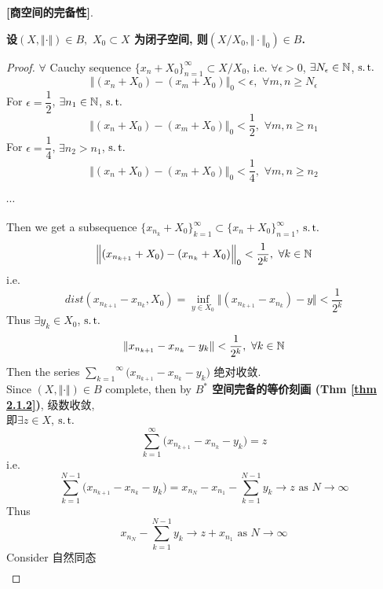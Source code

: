 	\vspace{1em}
	
	\begin{thm}\label{thm 2.4.1}
		\textbf{[商空间的完备性]}. 
		\begin{center}
			\textbf{设$(X , \Vert \cdot \Vert) \in B , \,\, X_0 \subset X$ 为闭子空间, 则$(X / X_0 , \Vert \cdot \Vert_0) \in B$.}
		\end{center}
		
		\vspace{4em}
		
		\begin{proof}
			$\forall$ Cauchy sequence $\{ x_n + X_0 \}_{n = 1}^{\infty} \subset X / X_0$, i.e. $\forall \epsilon > 0$, $\exists N_\epsilon \in \mathbb{N}$, $\operatorname{s.t.}$
			\[ \Big\Vert (x_n + X_0) - (x_m + X_0) \Big\Vert_0 < \epsilon , \,\, \forall m , n \geq N_\epsilon \]
			For $\epsilon = \dfrac{1}{2}$, $\exists n_1 \in \mathbb{N}$, $\operatorname{s.t.}$
			\[ \Big\Vert (x_n + X_0) - (x_m + X_0) \Big\Vert_0 < \frac{1}{2} , \,\, \forall m , n \geq n_1 \]
			For $\epsilon = \dfrac{1}{4}$, $\exists n_2 > n_1$, $\operatorname{s.t.}$
			\[ \Big\Vert (x_n + X_0) - (x_m + X_0) \Big\Vert_0 < \frac{1}{4} , \,\, \forall m , n \geq n_2 \]
			\begin{center}
				$\cdots$
			\end{center}
			Then we get a subsequence $\{ x_{n_k} + X_0 \}_{k = 1}^{\infty} \subset \{ x_n + X_0 \}_{n = 1}^{\infty}$, $\operatorname{s.t.}$
			\[ \Big\Vert (x_{n_{k + 1}} + X_0) - (x_{n_k} + X_0) \Big\Vert_0 < \frac{1}{2^k} , \,\, \forall k \in \mathbb{N} \]
			i.e.
			\[ dist(x_{n_{k + 1}} - x_{n_k} , X_0) = \inf_{y \in X_0} \Vert (x_{n_{k + 1}} - x_{n_k}) - y \Vert < \frac{1}{2^k} \]
			Thus $\exists y_k \in X_0$, $\operatorname{s.t.}$
			\[ \Vert x_{n_{k + 1}} - x_{n_k} - y_k \Vert < \frac{1}{2^k} , \,\, \forall k \in \mathbb{N} \]
			Then the series $\overset{\infty}{\underset{k = 1}{\sum}} \Big( x_{n_{k + 1}} - x_{n_k} - y_k \Big)$ 绝对收敛. \\
			Since $(X , \Vert \cdot \Vert) \in B$ complete, then by \textbf{$B^*$ 空间完备的等价刻画 (Thm \ref{thm 2.1.2})}, 级数收敛, \\
			即$\exists z \in X$, $\operatorname{s.t.}$
			\[
				\sum_{k = 1}^{\infty} \Big( x_{n_{k + 1}} - x_{n_k} - y_k \Big) = z
			\]
			i.e.
			\[
				\sum_{k = 1}^{N - 1} \Big( x_{n_{k + 1}} - x_{n_k} - y_k \Big) = x_{n_N} - x_{n_1} - \sum_{k = 1}^{N - 1} y_k \longrightarrow z \,\, \text{as} \,\, N \to \infty 
			\]
			Thus
			\[ x_{n_N} - \sum_{k = 1}^{N - 1} y_k \to z + x_{n_1} \,\, \text{as} \,\, N \to \infty \]
			Consider 自然同态
			\begin{align}

\end{align}
\end{proof}
\end{thm}

